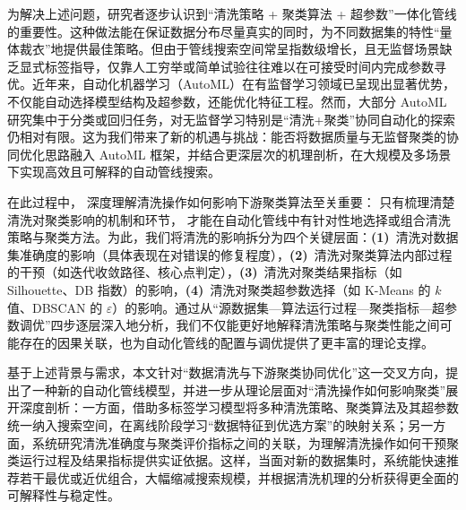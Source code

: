 \documentclass[10pt]{article} %
\numberwithin{equation}{section}
\begin{document}
为解决上述问题，研究者逐步认识到“清洗策略 + 聚类算法 + 超参数”一体化管线的重要性\cite{Blumenberg2020}。这种做法能在保证数据分布尽量真实的同时，为不同数据集的特性“量体裁衣”地提供最佳策略。但由于管线搜索空间常呈指数级增长，且无监督场景缺乏显式标签指导，仅靠人工穷举或简单试验往往难以在可接受时间内完成参数寻优。近年来，自动化机器学习（AutoML）在有监督学习领域已呈现出显著优势\cite{Barbudo2023}，不仅能自动选择模型结构及超参数，还能优化特征工程\cite{SALEHIN202452, HE2021106622}。然而，大部分 AutoML 研究集中于分类或回归任务\cite{9458702}，对无监督学习特别是“清洗+聚类”协同自动化的探索仍相对有限\cite{10.1145/3643564}。这为我们带来了新的机遇与挑战：能否将数据质量与无监督聚类的协同优化思路融入 AutoML 框架，并结合更深层次的机理剖析，在大规模及多场景下实现高效且可解释的自动管线搜索。

在此过程中， 深度理解清洗操作如何影响下游聚类算法至关重要： 只有梳理清楚清洗对聚类影响的机制和环节， 才能在自动化管线中有针对性地选择或组合清洗策略与聚类方法。为此，我们将清洗的影响拆分为四个关键层面：\textbf{(1)}~清洗对数据集准确度的影响（具体表现在对错误的修复程度），\textbf{(2)}~清洗对聚类算法内部过程的干预（如迭代收敛路径、核心点判定），\textbf{(3)}~清洗对聚类结果指标（如 Silhouette、DB 指数）的影响，\textbf{(4)}~清洗对聚类超参数选择（如 K-Means 的 $k$ 值、DBSCAN 的 $\varepsilon$）的影响。通过从“源数据集—算法运行过程—聚类指标—超参数调优”四步逐层深入地分析，我们不仅能更好地解释清洗策略与聚类性能之间可能存在的因果关联，也为自动化管线的配置与调优提供了更丰富的理论支撑。

基于上述背景与需求，本文针对“数据清洗与下游聚类协同优化”这一交叉方向，提出了一种新的自动化管线模型，并进一步从理论层面对“清洗操作如何影响聚类”展开深度剖析：一方面，借助多标签学习模型将多种清洗策略、聚类算法及其超参数统一纳入搜索空间，在离线阶段学习“数据特征到优选方案”的映射关系；另一方面，系统研究清洗准确度与聚类评价指标之间的关联，为理解清洗操作如何干预聚类运行过程及结果指标提供实证依据。这样，当面对新的数据集时，系统能快速推荐若干最优或近优组合，大幅缩减搜索规模，并根据清洗机理的分析获得更全面的可解释性与稳定性。
\end{document}
